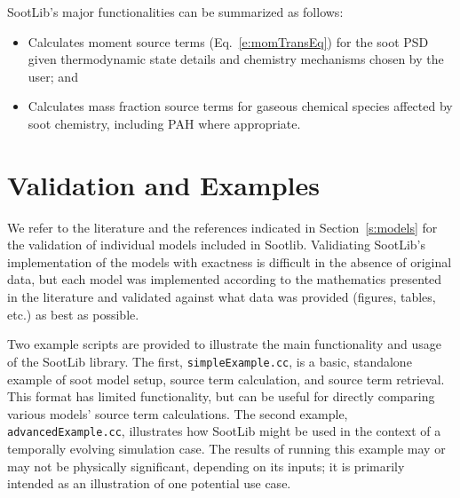\documentclass[preprint,letterpaper]{elsarticle}
\begin{document}
SootLib's major functionalities can be summarized as follows:
\begin{itemize}
    \item Calculates moment source terms (Eq.~\ref{e:momTransEq}) for the soot PSD given thermodynamic state details and chemistry mechanisms chosen by the user; and
    \item Calculates mass fraction source terms for gaseous chemical species affected by soot chemistry, including PAH where appropriate.
\end{itemize}


\section{Validation and Examples}
\label{s:examples}

We refer to the literature and the references indicated in Section~\ref{s:models} for the validation of individual models included in Sootlib. Validiating SootLib's implementation of the models with exactness is difficult in the absence of original data, but each model was implemented according to the mathematics presented in the literature and validated against what data was provided (figures, tables, etc.) as best as possible.

Two example scripts are provided to illustrate the main functionality and usage of the SootLib library. The first, \texttt{simpleExample.cc}, is a basic, standalone example of soot model setup, source term calculation, and source term retrieval. This format has limited functionality, but can be useful for directly comparing various models' source term calculations. The second example, \texttt{advancedExample.cc}, illustrates how SootLib might be used in the context of a temporally evolving simulation case. The results of running this example may or may not be physically significant, depending on its inputs; it is primarily intended as an illustration of one potential use case.
\end{document}
